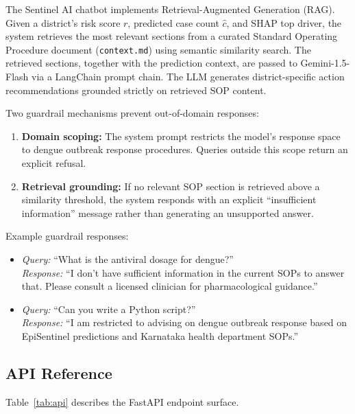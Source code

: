 \documentclass[conference]{IEEEtran}
\begin{document}
The Sentinel AI chatbot implements Retrieval-Augmented Generation
(RAG). Given a district's risk score $r$, predicted case count
$\hat{c}$, and SHAP top driver, the system retrieves the most
relevant sections from a curated Standard Operating Procedure
document (\texttt{context.md}) using semantic similarity search.
The retrieved sections, together with the prediction context, are
passed to Gemini-1.5-Flash via a LangChain prompt chain. The LLM
generates district-specific action recommendations grounded
strictly on retrieved SOP content.

Two guardrail mechanisms prevent out-of-domain responses:

\begin{enumerate}
  \item \textbf{Domain scoping:} The system prompt restricts the
    model's response space to dengue outbreak response procedures.
    Queries outside this scope return an explicit refusal.
  \item \textbf{Retrieval grounding:} If no relevant SOP section
    is retrieved above a similarity threshold, the system responds
    with an explicit ``insufficient information'' message rather
    than generating an unsupported answer.
\end{enumerate}

Example guardrail responses:

\begin{itemize}
  \item \textit{Query:} ``What is the antiviral dosage for dengue?''\\
    \textit{Response:} ``I don't have sufficient information in
    the current SOPs to answer that. Please consult a licensed
    clinician for pharmacological guidance.''
  \item \textit{Query:} ``Can you write a Python script?''\\
    \textit{Response:} ``I am restricted to advising on dengue
    outbreak response based on EpiSentinel predictions and
    Karnataka health department SOPs.''
\end{itemize}

\subsection{API Reference}

Table~\ref{tab:api} describes the FastAPI endpoint surface.
\end{document}
